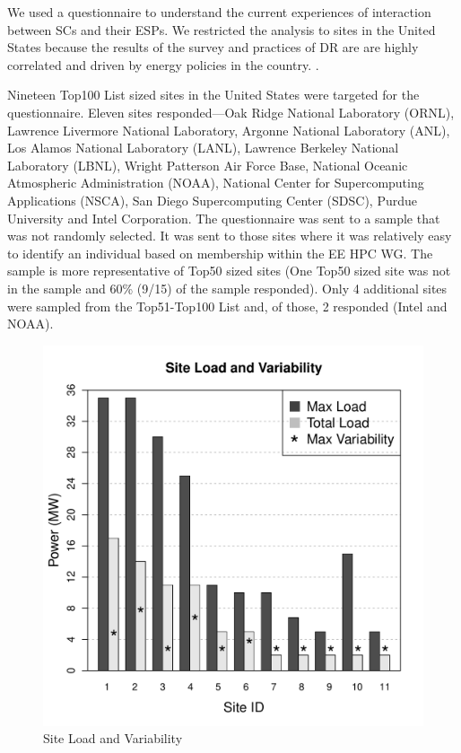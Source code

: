 We used a questionnaire to understand the current experiences of interaction between
SCs and their ESPs. We restricted the analysis to sites in the United States
because the results of the survey and practices of DR are are highly
correlated and driven by energy policies in the country. 
\cite{torriti_demand_2010}.

Nineteen Top100 List sized sites in the United States were targeted for the
questionnaire. Eleven sites responded---Oak Ridge National Laboratory (ORNL), 
Lawrence Livermore National Laboratory, 
Argonne National Laboratory (ANL), 
Los Alamos National Laboratory (LANL), 
Lawrence Berkeley National Laboratory (LBNL), 
Wright Patterson Air Force Base,
National Oceanic Atmospheric Administration (NOAA), 
National Center for Supercomputing Applications (NSCA), 
San Diego Supercomputing Center (SDSC), 
Purdue University and Intel Corporation. The questionnaire was
sent to a sample that was not randomly selected. It was sent to those sites
where it was relatively easy to identify an individual based on membership
within the EE HPC WG. The sample is more representative of Top50 sized sites
(One Top50 sized site was not in the sample and 60{\%} (9/15) of the sample
responded). Only 4 additional sites were sampled from the Top51-Top100 List
and, of those, 2 responded (Intel and NOAA).
\begin{figure}[htbp]
\begin{center}
\includegraphics[scale=0.45]{NewGraphs/Table1-graph.pdf}
\caption{Site Load and Variability}
\label{figGraph1}
\end{center}
\end{figure}

